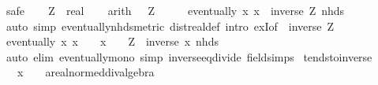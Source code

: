 \begin{isabellebody}
\ safe\isanewline
\ \ \isamarkupfalse%
\ Z\ {\isacharcolon}{\kern0pt}{\isacharcolon}{\kern0pt}\ real\isanewline
\ \ \isamarkupfalse%
\ {\isacharbrackleft}{\kern0pt}arith{\isacharbrackright}{\kern0pt}{\isacharcolon}{\kern0pt}\ {\isachardoublequoteopen}{}\ {\isacharless}{\kern0pt}\ Z{\isachardoublequoteclose}\isanewline
\ \ \isamarkupfalse%
\ \isamarkupfalse%
\ {\isachardoublequoteopen}eventually\ {\isacharparenleft}{\kern0pt}{\isasymlambda}x{\isachardot}{\kern0pt}\ x\ {\isacharless}{\kern0pt}\ inverse\ Z{\isacharparenright}{\kern0pt}\ {\isacharparenleft}{\kern0pt}nhds\ {}{\isacharparenright}{\kern0pt}{\isachardoublequoteclose}\isanewline
\ \ \ \ \isamarkupfalse%
\ {\isacharparenleft}{\kern0pt}auto\ simp{\isacharcolon}{\kern0pt}\ eventually{\isacharunderscore}{\kern0pt}nhds{\isacharunderscore}{\kern0pt}metric\ dist{\isacharunderscore}{\kern0pt}real{\isacharunderscore}{\kern0pt}def\ intro{\isacharbang}{\kern0pt}{\isacharcolon}{\kern0pt}\ exI{\isacharbrackleft}{\kern0pt}of\ {\isacharunderscore}{\kern0pt}\ {\isachardoublequoteopen}{\isasymbar}inverse\ Z{\isasymbar}{\isachardoublequoteclose}{\isacharbrackright}{\kern0pt}{\isacharparenright}{\kern0pt}\isanewline
\ \ \isamarkupfalse%
\ \isamarkupfalse%
\ {\isachardoublequoteopen}eventually\ {\isacharparenleft}{\kern0pt}{\isasymlambda}x{\isachardot}{\kern0pt}\ x\ {\isasymnoteq}\ {}\ {\isasymlongrightarrow}\ x\ {\isasymin}\ {\isacharbraceleft}{\kern0pt}{}{\isacharless}{\kern0pt}{\isachardot}{\kern0pt}{\isachardot}{\kern0pt}{\isacharbraceright}{\kern0pt}\ {\isasymlongrightarrow}\ Z\ {\isasymle}\ inverse\ x{\isacharparenright}{\kern0pt}\ {\isacharparenleft}{\kern0pt}nhds\ {}{\isacharparenright}{\kern0pt}{\isachardoublequoteclose}\isanewline
\ \ \ \ \isamarkupfalse%
\ {\isacharparenleft}{\kern0pt}auto\ elim{\isacharbang}{\kern0pt}{\isacharcolon}{\kern0pt}\ eventually{\isacharunderscore}{\kern0pt}mono\ simp{\isacharcolon}{\kern0pt}\ inverse{\isacharunderscore}{\kern0pt}eq{\isacharunderscore}{\kern0pt}divide\ field{\isacharunderscore}{\kern0pt}simps{\isacharparenright}{\kern0pt}\isanewline
{}\isamarkupfalse%
%
\endisatagproof
{\isafoldproof}%
%
\isadelimproof
\isanewline
%
\endisadelimproof
\isanewline
{}\isamarkupfalse%
\ tendsto{\isacharunderscore}{\kern0pt}inverse{\isacharunderscore}{\kern0pt}{}{\isacharcolon}{\kern0pt}\isanewline
\ \ \ x\ {\isacharcolon}{\kern0pt}{\isacharcolon}{\kern0pt}\ {\isachardoublequoteopen}{\isacharunderscore}{\kern0pt}\ {\isasymRightarrow}\ {\isacharprime}{\kern0pt}a{\isacharcolon}{\kern0pt}{\isacharcolon}{\kern0pt}real{\isacharunderscore}{\kern0pt}normed{\isacharunderscore}{\kern0pt}div{\isacharunderscore}{\kern0pt}algebra{\isachardoublequoteclose}\isanewline

\end{isabellebody}
